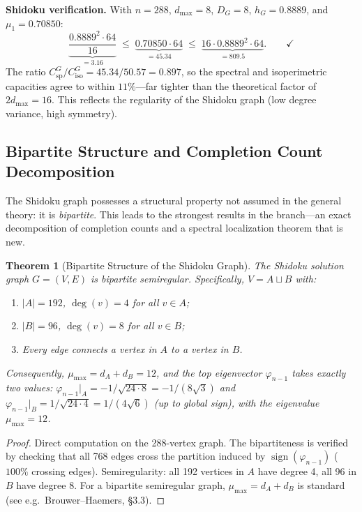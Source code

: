 \documentclass[11pt]{article}
\newtheorem{theorem}{Theorem}[section]
\theoremstyle{definition}
\theoremstyle{remark}
\newcommand{\Csp}{C_{\mathrm{sp}}}
\begin{document}
\textbf{Shidoku verification.} With $n = 288$, $d_{\max} = 8$, $D_G = 8$, $h_G = 0.8889$, and $\mu_1 = 0.70850$:
\[
\underbrace{\frac{0.8889^2 \cdot 64}{16}}_{= 3.16} \;\le\; \underbrace{0.70850 \cdot 64}_{= 45.34} \;\le\; \underbrace{16 \cdot 0.8889^2 \cdot 64}_{= 809.5}. \qquad\checkmark
\]
The ratio $\Csp^G / C_{\mathrm{iso}}^G = 45.34 / 50.57 = 0.897$, so the spectral and isoperimetric capacities agree to within $11\%$---far tighter than the theoretical factor of $2d_{\max} = 16$. This reflects the regularity of the Shidoku graph (low degree variance, high symmetry).


\subsection{Bipartite Structure and Completion Count Decomposition}\label{sec:bipartite}

The Shidoku graph possesses a structural property not assumed in the general theory: it is \emph{bipartite}. This leads to the strongest results in the branch---an exact decomposition of completion counts and a spectral localization theorem that is new.

\begin{theorem}[Bipartite Structure of the Shidoku Graph]\label{thm:bipartite}
The Shidoku solution graph $G = (V, E)$ is bipartite semiregular. Specifically, $V = A \sqcup B$ with:
\begin{enumerate}[nosep, label=(\roman*)]
\item $|A| = 192$, $\deg(v) = 4$ for all $v \in A$;
\item $|B| = 96$, $\deg(v) = 8$ for all $v \in B$;
\item Every edge connects a vertex in $A$ to a vertex in $B$.
\end{enumerate}
Consequently, $\mu_{\max} = d_A + d_B = 12$, and the top eigenvector $\varphi_{n-1}$ takes exactly two values: $\varphi_{n-1}|_A = -1/\sqrt{24 \cdot 8} = -1/(8\sqrt{3})$ and $\varphi_{n-1}|_B = 1/\sqrt{24 \cdot 4} = 1/(4\sqrt{6})$ (up to global sign), with the eigenvalue $\mu_{\max} = 12$.
\end{theorem}

\begin{proof}
Direct computation on the 288-vertex graph. The bipartiteness is verified by checking that all 768 edges cross the partition induced by $\operatorname{sign}(\varphi_{n-1})$ ($100\%$ crossing edges). Semiregularity: all 192 vertices in $A$ have degree 4, all 96 in $B$ have degree 8. For a bipartite semiregular graph, $\mu_{\max} = d_A + d_B$ is standard (see e.g.\ Brouwer--Haemers, \S3.3).
\end{proof}
\end{document}
